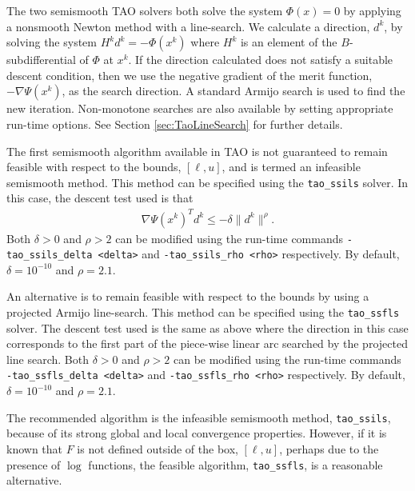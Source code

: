 The two semismooth TAO solvers both solve the system $\Phi(x) = 0$ by applying
a nonsmooth Newton method with a line-search.  We calculate a direction, $d^k$,
by solving the system $H^kd^k = -\Phi(x^k)$ where $H^k$ is an element of the 
$B$-subdifferential \cite{qi.sun:nonsmooth} of $\Phi$ at $x^k$.  If the 
direction calculated does not satisfy a suitable descent condition, then 
we use the negative gradient of the merit function, $-\nabla \Psi(x^k)$, as 
the search direction.  A standard Armijo search \cite{armijo:minimization} is
used to find the new iteration.  Non-monotone searches 
\cite{grippo.lampariello.ea:nonmonotone} are also available by setting 
appropriate run-time options.  See Section \ref{sec:TaoLineSearch} for further 
details.

The first semismooth algorithm available in TAO is not guaranteed to 
remain feasible with respect to the bounds, $[\ell, u]$, and is termed 
an infeasible semismooth method.  This method can be specified using the 
{\tt tao\_ssils} solver.  In this case, the descent test used is 
that
\begin{eqnarray*}
\nabla \Psi(x^k)^Td^k \leq -\delta\| d^k \|^\rho.
\end{eqnarray*}
Both $\delta > 0$ and $\rho > 2$ can be modified using the
run-time commands {\tt -tao\_ssils\_delta <delta>} and 
{\tt -tao\_ssils\_rho <rho>} respectively. By default, 
$\delta = 10^{-10}$ and $\rho = 2.1$.

An alternative is to remain feasible with respect to the bounds by using a 
projected Armijo line-search.  This method can be specified using the 
{\tt tao\_ssfls} solver.  The descent test used is the same as above 
where the direction in this case corresponds to the first part of the 
piece-wise linear arc searched by the projected line search.  
Both $\delta > 0$ and $\rho > 2$ can be modified using the run-time 
commands  {\tt -tao\_ssfls\_delta <delta>} and {\tt -tao\_ssfls\_rho <rho>} 
respectively.  By default, $\delta = 10^{-10}$ and $\rho = 2.1$.

The recommended algorithm is the infeasible semismooth method,
{\tt tao\_ssils}, because of its strong global and local convergence 
properties.  However, if it is known that $F$ is not defined outside 
of the box, $[\ell,u]$, perhaps due to the presence of $\log$ functions,
the feasible algorithm, {\tt tao\_ssfls}, is a reasonable alternative.

